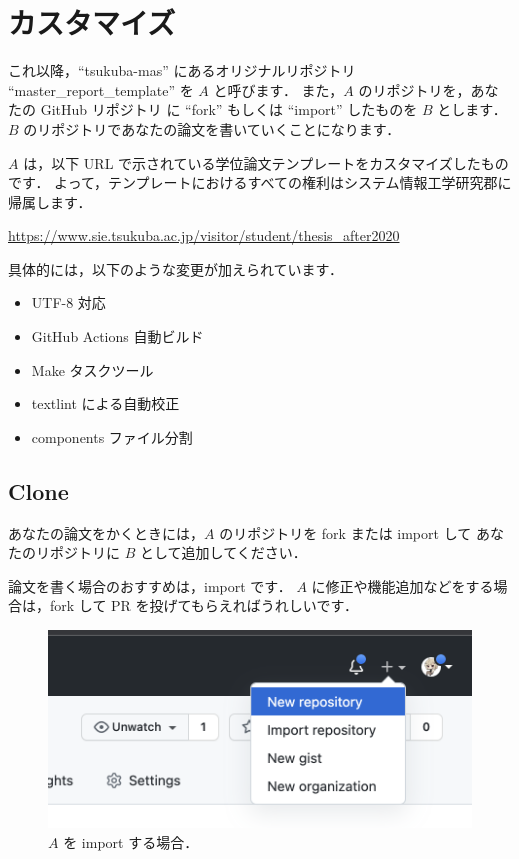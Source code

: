 \section{カスタマイズ}

これ以降，``tsukuba-mas'' にあるオリジナルリポジトリ ``master\_report\_template'' を $A$ と呼びます．
また，$A$ のリポジトリを，あなたの GitHub リポジトリ に ``fork'' もしくは ``import'' したものを $B$ とします．
$B$ のリポジトリであなたの論文を書いていくことになります．

$A$ は，以下 URL で示されている学位論文テンプレートをカスタマイズしたものです．
よって，テンプレートにおけるすべての権利はシステム情報工学研究郡に帰属します．

\url{https://www.sie.tsukuba.ac.jp/visitor/student/thesis_after2020}

具体的には，以下のような変更が加えられています．

\begin{itemize}
    \item UTF-8 対応
    \item GitHub Actions 自動ビルド
    \item Make タスクツール
    \item textlint による自動校正
    \item components ファイル分割
\end{itemize}

\subsection{Clone}

あなたの論文をかくときには，$A$ のリポジトリを fork または import して
あなたのリポジトリに $B$ として追加してください．

論文を書く場合のおすすめは，import です．
$A$ に修正や機能追加などをする場合は，fork して PR を投げてもらえればうれしいです．

\begin{figure}[H]
    \centering
    \includegraphics[width=0.5\linewidth]{static/introduction/import.png}
    \caption{$A$ を import する場合．}
\end{figure}

